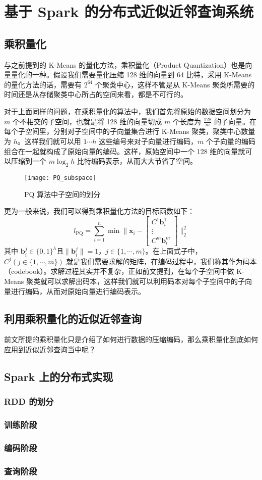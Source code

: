 

\chapter{基于 Spark 的分布式近似近邻查询系统}
\label{cha:ANNS_based_on_Spark}
\section{乘积量化}
与之前提到的 K-Means 的量化方法，乘积量化（Product Quantization）\cite{Herve_PQ}也是向量量化的一种。假设我们需要量化压缩 128 维的向量到 64 比特，采用 K-Means 的量化方法的话，需要有 $2^{64}$ 个聚类中心，这样不管是从 K-Means 聚类所需要的时间还是从存储聚类中心所占的空间来看，都是不可行的。

对于上面同样的问题，在乘积量化的算法中，我们首先将原始的数据空间划分为 $m$ 个不相交的子空间，也就是将 128 维的向量切成 $m$ 个长度为 $\frac{128}{m}$ 的子向量。在每个子空间里，分别对子空间中的子向量集合进行 K-Means 聚类，聚类中心数量为 $h$。这样我们就可以用 $1\cdots h$ 这些编号来对子向量进行编码，$m$ 个子向量的编码组合在一起就构成了原始向量的编码。这样，原始空间中一个 128 维的向量就可以压缩到一个 $m\log_2h$ 比特编码表示，从而大大节省了空间。
\begin{figure}[H]
  \centering
  \texttt{[image: PQ\_subspace]}
  \caption{PQ 算法中子空间的划分}
  \label{fig:PQ_subspace}
\end{figure}
更为一般来说，我们可以得到乘积量化方法的目标函数如下：
\begin{equation}
\mathit{l}_\mathrm{PQ} = \sum_{i=1}^n\min\Bigg\lVert \mathbf{x}_i - \begin{bmatrix}C^1\mathbf{b}^1_i\\\vdots\\C^m\mathbf{b}^m_i\end{bmatrix} \Bigg\rVert _2^2
\end{equation}
其中 $\mathbf{b}^j_i \in \{0,1\}^h$且$\lVert\mathbf{b}^j_i\rVert=1$，$j \in \{1,\cdots,m\}$。在上面式子中，$C^j(j\in \{1,\cdots,m\})$ 就是我们需要求解的矩阵，在编码过程中，我们称其作为码本（codebook）。求解过程其实并不复杂，正如前文提到，在每个子空间中做 K-Means 聚类就可以求解出码本，这样我们就可以利用码本对每个子空间中的子向量进行编码，从而对原始向量进行编码表示。
\section{利用乘积量化的近似近邻查询}
前文所提的乘积量化只是介绍了如何进行数据的压缩编码，那么乘积量化到底如何应用到近似近邻查询当中呢？
\section{Spark 上的分布式实现}
\subsection{RDD 的划分}
\subsection{训练阶段}
\subsection{编码阶段}
\subsection{查询阶段}

